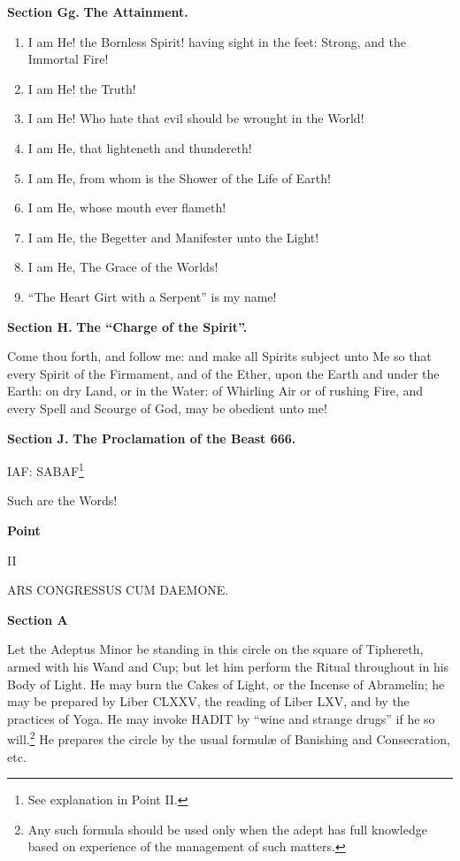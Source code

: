 
\textbf{Section Gg.} \hfill \textbf{The Attainment.}
\begin{enumerate}
\item I am He! the Bornless Spirit! having sight in the feet: Strong, and the Immortal Fire!
\item I am He! the Truth!
\item I am He! Who hate that evil should be wrought in the World!
\item I am He, that lighteneth and thundereth!
\item I am He, from whom is the Shower of the Life of Earth!
\item I am He, whose mouth ever flameth!
\item I am He, the Begetter and Manifester unto the Light!
\item I am He, The Grace of the Worlds!
\item \enquote{The Heart Girt with a Serpent} is my name!
\end{enumerate}


\textbf{Section H.} \hfill \textbf{The \enquote{Charge of the Spirit}.}


 Come thou forth, and follow me: and make all Spirits subject unto Me so that every Spirit of the Firmament, and of the Ether, upon the Earth and under the Earth: on dry Land, or in the Water: of Whirling Air or of rushing Fire, and every Spell and Scourge of God, may be obedient unto me!


\textbf{Section J.} \hfill \textbf{The Proclamation of the Beast 666.}

IAF: \hspace{0.25em} SABAF\footnote{See explanation in Point II.}

\hspace{1em} Such are the Words!

\pagebreak

{\centering
\textbf{Point}

II

ARS CONGRESSUS CUM DAEMONE.
\par}

\textbf{Section A}


Let the Adeptus Minor be standing in this circle on the square of Tiphereth, armed with his Wand and Cup; but let him perform the Ritual throughout in his Body of Light. He may burn the Cakes of Light, or the Incense of Abramelin; he may be prepared by Liber CLXXV, the reading of Liber LXV, and by the practices of Yoga. He may invoke HADIT by \enquote{wine and strange drugs} if he so will.\footnote{Any such formula should be used only when the adept has full knowledge based on experience of the management of such matters.} He prepares the circle by the usual formul\ae{} of Banishing and Consecration, etc.

